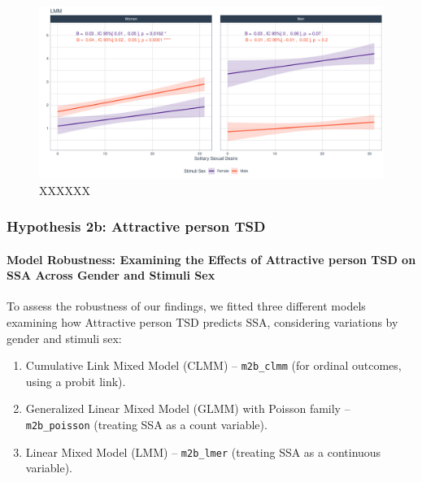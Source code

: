\documentclass[
  bookmarksnumbered]{article}
\providecommand{\tightlist}{%
  \setlength{\itemsep}{0pt}\setlength{\parskip}{0pt}}
\begin{document}
\begin{figure}
\centering
\includegraphics{Sexual_Desire_Arousal_V2_files/figure-latex/fig-h2a-1.pdf}
\caption{\label{fig:fig-h2a}XXXXXX}
\end{figure}

\subsubsection{Hypothesis 2b: Attractive person TSD}\label{hyp2b}

\paragraph{Model Robustness: Examining the Effects of Attractive person TSD on SSA Across Gender and Stimuli Sex}\label{model-robustness-examining-the-effects-of-attractive-person-tsd-on-ssa-across-gender-and-stimuli-sex}

To assess the robustness of our findings, we fitted three different models examining how Attractive person TSD predicts SSA, considering variations by gender and stimuli sex:

\begin{enumerate}
\def\labelenumi{\arabic{enumi}.}
\tightlist
\item
  Cumulative Link Mixed Model (CLMM) -- \texttt{m2b\_clmm} (for ordinal outcomes, using a probit link).
\item
  Generalized Linear Mixed Model (GLMM) with Poisson family -- \texttt{m2b\_poisson} (treating SSA as a count variable).
\item
  Linear Mixed Model (LMM) -- \texttt{m2b\_lmer} (treating SSA as a continuous variable).
\end{enumerate}
\end{document}
